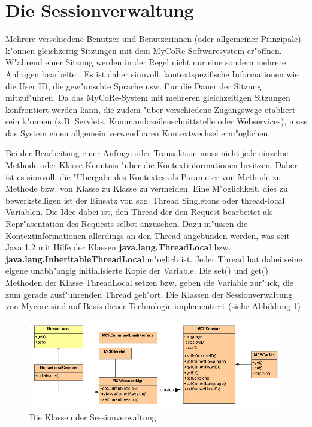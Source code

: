 \section{Die Sessionverwaltung}
\label{sec:Sessionverwaltung}

Mehrere verschiedene Benutzer und Benutzerinnen (oder allgemeiner Prinzipale) 
k"onnen gleichzeitig Sitzungen mit dem MyCoRe-Softwaresystem er"offnen. 
W"ahrend einer Sitzung werden in der Regel nicht nur eine sondern mehrere Anfragen bearbeitet. 
Es ist daher sinnvoll, kon\-text\-spe\-zi\-fi\-sche Informationen wie die User ID, die 
gew"unschte Sprache usw. f"ur die Dauer der Sitzung mitzuf"uhren.
Da das MyCoRe-System mit mehreren gleichzeitigen Sitzungen konfrontiert
werden kann, die zudem "uber verschiedene Zugangswege etabliert sein k"onnen
(z.B. Servlets, Kommandozeilenschnittstelle oder Webservices), muss das System
einen allgemein verwendbaren Kontextwechsel erm"oglichen. 

Bei der Bearbeitung einer Anfrage oder Transaktion muss nicht jede einzelne
Methode oder Klasse Kenntnis "uber die Kontextinformationen besitzen.
Daher ist es sinnvoll, die "Ubergabe des Kontextes als Parameter von Methode
zu Methode bzw. von Klasse zu Klasse zu vermeiden.
Eine M"oglichkeit, dies zu bewerkstelligen ist der Einsatz von sog. Thread Singletons oder
thread-local Variablen.
Die Idee dabei ist, den Thread der den Request bearbeitet als Repr"asentation
des Requests selbst anzusehen.
Dazu m"ussen die Kontextinformationen allerdings an den Thread angebunden werden, was
seit Java 1.2 mit Hilfe der Klassen {\bf java.lang.ThreadLocal} bzw. 
{\bf java.lang.InheritableThreadLocal} m"oglich ist.
Jeder Thread hat dabei seine eigene unabh"angig initialisierte Kopie der Variable.
Die set() und get() Methoden der Klasse ThreadLocal setzen bzw. geben die Variable
zur"uck, die zum gerade ausf"uhrenden Thread geh"ort.
Die Klassen der Sessionverwaltung von Mycore sind auf Basis dieser Technologie
implementiert (siehe Abbildung {\ref{fig:Sessionklassen}})

\begin{figure}[h]
  \begin{center}
    \includegraphics[scale=0.59]{ProgGuide_2Session_classes.jpg}
    \caption{Die Klassen der Sessionverwaltung}
    \label{fig:Sessionklassen}
  \end{center}
  \vspace{-1.4cm}
\end{figure} 

